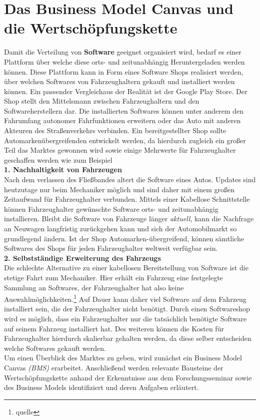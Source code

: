 \section{Das Business Model Canvas und die Wertschöpfungskette}\label{markt}
Damit die Verteilung von \textbf{Software} geeignet organisiert wird, bedarf es einer Plattform über welche diese orts- und zeitunabhängig Heruntergeladen werden können. Diese Plattform kann in Form eines Software Shops realisiert werden, über welchen Softwares von Fahrzeughaltern gekauft und installiert werden können. Ein passender Vergleichaus der Realität ist der Google Play Store. Der Shop stellt den Mittelsmann zwischen Fahrzeughaltern und den Softwareherstellern dar. Die installierten Softwares können unter anderem den Fahrumfang autonomer Fahrfunktionen erweitern oder das Auto mit anderen Akteuren des Straßenverkehrs verbinden. Ein bereitgestellter Shop sollte Automarkenübergreifenden entwickelt werden, da hierdurch zugleich ein großer Teil das Marktes gewonnen wird sowie einige Mehrwerte für Fahrzeughalter geschaffen werden wie zum Beispiel\\

\textbf{1. Nachhaltigkeit von Fahrzeugen}\\
Nach dem verlassen des Fließbandes altert die Software eines Autos. Updates sind heutzutage nur beim Mechaniker möglich und sind daher mit einem großen Zeitaufwand für Fahrzeughalter verbunden. Mittels einer Kabellose Schnittstelle können Fahrzeughalter gewünschte Software orts- und zeitunabhängig installieren. Bleibt die Software von Fahrzeuge länger \textit{\glqq aktuell\grqq}, kann die Nachfrage an Neuwagen langfristig zurückgehen kann und sich der Automobilmarkt so grundlegend ändern. Ist der Shop Automarken-übergreifend, können sämtliche Softwares des Shops für jeden Fahrzeughalter weltweit verfügbar sein.\\


\textbf{2. Selbstständige Erweiterung des Fahrzeugs}\\
Die schlechte Alternative zu einer kabellosen Bereitstellung von Software ist die stetige Fahrt zum Mechaniker. Hier erhält ein Fahrzeug eine festgelegte Sammlung an Softwares, der Fahrzeughalter hat also keine Auswahlmöglichkeiten.\footnote{quelle} Auf Dauer kann daher viel Software auf dem Fahrzeug installiert sein, die der Fahrzeughalter nicht benötigt. Durch einen Softwareshop wird es möglich, dass ein Fahrzeughalter nur die tatsächlich benötigte Software auf seinem Fahrzeug installiert hat. Des weiteren können die Kosten für Fahrzeughalter hierdurch skalierbar gehalten werden, da diese selber entscheiden welche Softwares gekauft werden.\\

Um einen Überblick des Marktes zu geben, wird zunächst ein Business Model Canvas \textit{(BMS)} erarbeitet. Anschließend werden relevante Bausteine der Wertschöpfungskette anhand der Erkenntnisse aus dem Forschungsseminar sowie des Business Models identifiziert und deren Aufgaben erläutert.